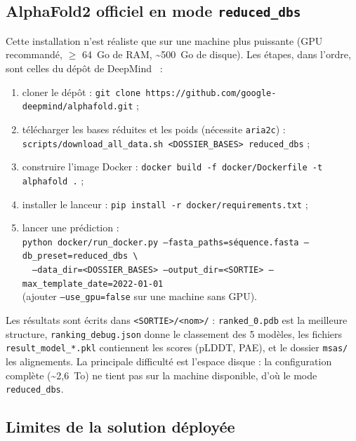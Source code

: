 \subsection{AlphaFold2 officiel en mode \texttt{reduced\_dbs}}

Cette installation n'est réaliste que sur une machine plus puissante (GPU recommandé, $\geq$ 64~Go de RAM, \textasciitilde 500~Go de disque). Les étapes, dans l'ordre, sont celles du dépôt de DeepMind~\cite{alphafold_github} :
\begin{enumerate}
  \item cloner le dépôt : \texttt{git clone https://github.com/google-deepmind/alphafold.git} ;
  \item télécharger les bases réduites et les poids (nécessite \texttt{aria2c}) :\\
  \texttt{scripts/download\_all\_data.sh <DOSSIER\_BASES> reduced\_dbs} ;
  \item construire l'image Docker : \texttt{docker build -f docker/Dockerfile -t alphafold .} ;
  \item installer le lanceur : \texttt{pip install -r docker/requirements.txt} ;
  \item lancer une prédiction :\\
  \texttt{python docker/run\_docker.py --fasta\_paths=séquence.fasta --db\_preset=reduced\_dbs \textbackslash}\\
  \texttt{\ \ --data\_dir=<DOSSIER\_BASES> --output\_dir=<SORTIE> --max\_template\_date=2022-01-01}\\
  (ajouter \texttt{--use\_gpu=false} sur une machine sans GPU).
\end{enumerate}
Les résultats sont écrits dans \texttt{<SORTIE>/<nom>/} : \texttt{ranked\_0.pdb} est la meilleure structure, \texttt{ranking\_debug.json} donne le classement des 5 modèles, les fichiers \texttt{result\_model\_*.pkl} contiennent les scores (pLDDT, PAE), et le dossier \texttt{msas/} les alignements. La principale difficulté est l'espace disque : la configuration complète (\textasciitilde 2,6~To) ne tient pas sur la machine disponible, d'où le mode \texttt{reduced\_dbs}.

\subsection{Limites de la solution déployée}

